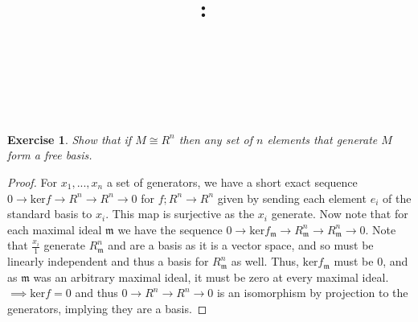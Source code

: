 \documentclass{article}
\title{
    \vspace{2in}
    \textmd{\textbf{\hmwkClass:\ \hmwkTitle}}\\
    \vspace{0.1in}
    \textmd{\hmwkDueDate} \\
    \vspace{0.2in}\large{\textit{\hmwkClassInstructor\  }}
    \vspace{2in}
}
\author{\hmwkAuthorName}
\date{}
\newcommand{\fk}[1]{\mathfrak{#1}}
\newtheorem{exercise}{Exercise}
\begin{document}
\maketitle
\newpage

\begin{exercise}
  Show that if $M \cong R^{n}$ then any set of $n$ elements that generate $M$ form a free basis.
\end{exercise}
\begin{proof}
  For $x_{1},...,x_{n}$ a set of generators, we have a short exact sequence $0 \to \text{ker}f \to R^{n} \to R^{n} \to 0$ for $f; R^{n} \to R^{n}$ given by sending each element $e_{i}$ of the standard basis to $x_{i}$. This map is surjective as the $x_{i}$ generate. Now note that for each maximal ideal $\fk{m}$ we have the sequence $0 \to \text{ker}f_{\fk{m}} \to R_{\fk{m}}^{n} \to R_{{\fk{m}}}^{n} \to 0$. Note that $\frac{x_{i}}{1}$ generate $R_{\fk{m}}^{n}$ and are a basis as it is a vector space, and so must be linearly independent and thus a basis for $R_{{\fk{m}}}^{n}$ as well. Thus, $\text{ker}f_{\fk{m}}$ must be $0$, and as $\fk{m}$ was an arbitrary maximal ideal, it must be zero at every maximal ideal.\\
  $\implies \text{ker}f = 0$ and thus $0 \to R^{n} \to R^{n} \to 0$ is an isomorphism by projection to the generators, implying they are a basis. 
\end{proof}
\end{document}

